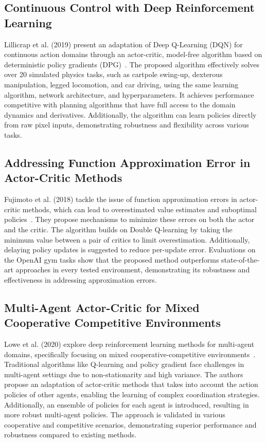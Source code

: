 \documentclass[journal]{IEEEtran}
\begin{document}
\subsection{Continuous Control with Deep Reinforcement Learning} %
Lillicrap et al. (2019) present an adaptation of Deep Q-Learning (DQN) 
for continuous action domains through an actor-critic, 
model-free algorithm based on deterministic policy gradients (DPG)~\cite{lillicrap2019}. 
The proposed algorithm effectively solves over 20 simulated physics tasks, 
such as cartpole swing-up, dexterous manipulation, legged locomotion, and car driving, 
using the same learning algorithm, network architecture, and hyperparameters. 
It achieves performance competitive with planning algorithms that have full access to the 
domain dynamics and derivatives. Additionally, the algorithm can learn policies directly from 
raw pixel inputs, demonstrating robustness and flexibility across various tasks.

\subsection{Addressing Function Approximation Error in Actor-Critic Methods}
Fujimoto et al. (2018) tackle the issue of function approximation errors in actor-critic methods, 
which can lead to overestimated value estimates and suboptimal policies~\cite{fujimoto2018}. 
They propose mechanisms to minimize these errors on both the actor and the critic. The algorithm 
builds on Double Q-learning by taking the minimum value between a pair of critics to limit 
overestimation. Additionally, delaying policy updates is suggested to reduce per-update error. 
Evaluations on the OpenAI gym tasks show that the proposed method outperforms state-of-the-art 
approaches in every tested environment, demonstrating its robustness and effectiveness in 
addressing approximation errors.

\subsection{Multi-Agent Actor-Critic for Mixed Cooperative Competitive Environments} 
Lowe et al. (2020) explore deep reinforcement learning methods for multi-agent domains, 
specifically focusing on mixed cooperative-competitive environments~\cite{lowe2020}. 
Traditional algorithms like Q-learning and policy gradient face challenges in multi-agent settings 
due to non-stationarity and high variance. The authors propose an adaptation of actor-critic 
methods that takes into account the action policies of other agents, 
enabling the learning of complex coordination strategies. 
Additionally, an ensemble of policies for each agent is introduced, resulting in more robust 
multi-agent policies. The approach is validated in various cooperative and competitive scenarios, 
demonstrating superior performance and robustness compared to existing methods.
\end{document}
